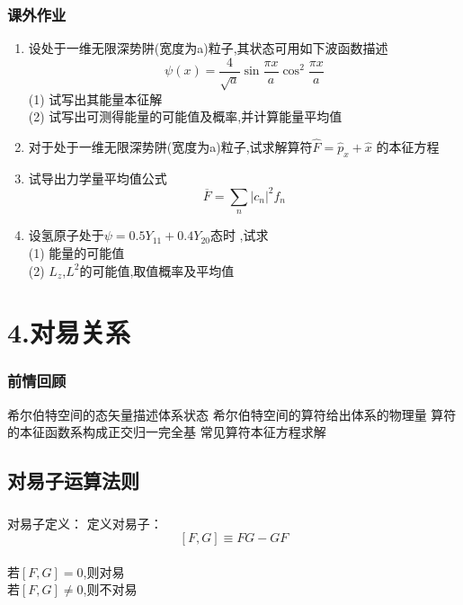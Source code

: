 \begin{frame}
    \frametitle{课外作业}
    \begin{enumerate}
        \item 设处于一维无限深势阱(宽度为a)粒子,其状态可用如下波函数描述
        \[ \psi(x)=\frac{4}{\sqrt{a}}\sin \frac{\pi x}{a} \cos ^2 \frac{\pi x}{a}  \]
            (1) 试写出其能量本征解\\
            (2) 试写出可测得能量的可能值及概率,并计算能量平均值\\
        \item 对于处于一维无限深势阱(宽度为a)粒子,试求解算符$\hat{F}=\hat{p}_x + \hat{x}$ 的本征方程
        \item 试导出力学量平均值公式\[ \overline{F}=\sum_n \left|c_n\right|^2f_n\]
        \item 设氢原子处于$\psi=0.5Y_{11}+0.4Y_{20}$态时 ,试求\\
        (1) 能量的可能值\\
        (2) $L_z$,$L^2$的可能值,取值概率及平均值 \\
    \end{enumerate}
\end{frame}



\section{4.对易关系}

\begin{frame}
    \frametitle{前情回顾}
    \begin{itemize}
        \Item 希尔伯特空间的态矢量描述体系状态
        \Item 希尔伯特空间的算符给出体系的物理量
        \Item 算符的本征函数系构成正交归一完全基
        \Item 常见算符本征方程求解
    \end{itemize}   
\end{frame} 

\subsection{对易子运算法则}

\begin{frame} 
    \frametitle{}
    \begin{tcolorbox1}{对易子定义：}
        定义对易子：$$ [F,G]\equiv FG-GF $$ \\
        若$[F,G]=0$,则对易 \\
        若$[F,G]\neq0$,则不对易  
    \end{tcolorbox1}
\end{frame} 

